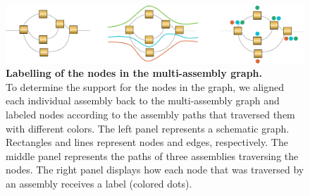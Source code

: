 \documentclass[../main.tex]{subfiles}
\begin{document}
\fi


\newpage

\setcounter{subsection}{0}
\renewcommand \thesubsection {Note S4.\arabic{subsection}}
\setcounter{figure}{0}
\renewcommand \thefigure {S4.\arabic{figure}}
\setcounter{table}{0}
\renewcommand \thetable {S4.\arabic{table}}

\begin{flushleft}

\begin{figure}[!htb]
    \centering
    \includegraphics[width=\textwidth]{paper3/supplement/sp41.pdf}
    \caption[Node labelling procedures]{\textbf{Labelling of the nodes in the multi-assembly graph.} \\
    \small{To determine the support for the nodes in the graph, we aligned each individual assembly back to the multi-assembly graph and labeled nodes according to the assembly paths that traversed them with different colors. The left panel represents a schematic graph. Rectangles and lines represent nodes and edges, respectively. The middle panel represents the paths of three assemblies traversing the nodes. The right panel displays how each node that was traversed by an assembly receives a label (colored dots).}}
    \label{sup_fig:s41}
\end{figure}


\newpage


\end{flushleft}
\end{document}
